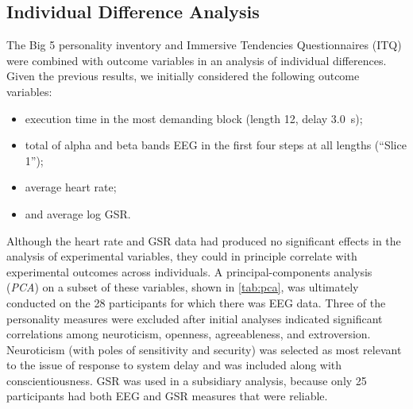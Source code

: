 \documentclass[10pt,letterpaper]{article}
\begin{document}
\subsection{Individual Difference Analysis}

The Big 5 personality inventory and Immersive Tendencies Questionnaires (ITQ) were combined with outcome variables in an analysis of individual differences.
Given the previous results, we initially considered the following outcome variables:
\begin{itemize}
    \item execution time in the most demanding block (length 12, delay \SI{3.0}{\second}); 
    \item total of alpha and beta bands EEG in the first four steps at all lengths (``Slice 1'');
    \item average heart rate;
    \item and average log GSR.\@
\end{itemize}

Although the heart rate and GSR data had produced no significant effects in the analysis of experimental variables, they could in principle correlate with experimental outcomes across individuals. 
A principal-components analysis (\emph{PCA}) on a subset of these variables, shown in \cref{tab:pca}, was ultimately conducted on the 28 participants for which there was EEG data. 
Three of the personality measures were excluded after initial analyses indicated significant correlations among neuroticism, openness, agreeableness, and extroversion.
Neuroticism (with poles of sensitivity and security) was selected as most relevant to the issue of response to system delay and was included along with conscientiousness.
GSR was used in a subsidiary analysis, because only 25 participants had both EEG and GSR measures that were reliable.
\end{document}

